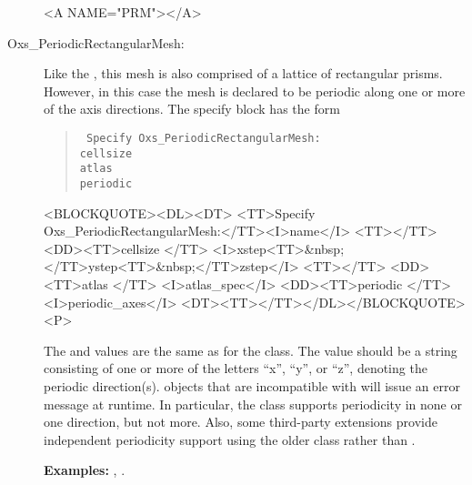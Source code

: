 \begin{description}
\begin{rawhtml}<A NAME="PRM"></A>\end{rawhtml}%
\label{html:oxsperiodicrectangularmesh}%
\item[Oxs\_PeriodicRectangularMesh:]
Like the , this mesh is also comprised of a
lattice of rectangular prisms.  However, in this case the
mesh is declared to be periodic along one or more of the axis
directions.  The specify block has the form
\begin{latexonly}
\begin{quote}\tt
Specify Oxs\_PeriodicRectangularMesh: \ocb \\
\bi cellsize \ocb{}\ccb\\
\bi atlas \\
\bi periodic \\
\ccb
\end{quote}
\end{latexonly}
\begin{rawhtml}<BLOCKQUOTE><DL><DT>
<TT>Specify Oxs_PeriodicRectangularMesh:</TT><I>name</I> <TT>{</TT>
<DD><TT>cellsize {</TT>
  <I>xstep<TT>&nbsp;</TT>ystep<TT>&nbsp;</TT>zstep</I>
  <TT>}</TT>
<DD><TT>atlas </TT> <I>atlas_spec</I>
<DD><TT>periodic </TT> <I>periodic_axes</I>
<DT><TT>}</TT></DL></BLOCKQUOTE><P>
\end{rawhtml}
The  and  values are the same as
for the  class.  The 
value should be a string consisting of one or more of the letters
``x'', ``y'', or ``z'', denoting the periodic direction(s).
 objects that are incompatible with
 will issue an error message at
runtime.  In particular, the
 class supports
periodicity in none or one direction, but not more.  Also, some
third-party extensions provide independent periodicity support using
the older  class rather than
.

\textbf{Examples:} , .

\end{description}

